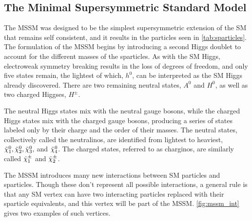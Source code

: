 \subsection{The Minimal Supersymmetric Standard Model}

The \ac{MSSM} was designed to be the simplest supersymmetric extension of the \ac{SM} that remains self consistent, and it results in the particles seen in \autoref{tab:sparticles}\cite{Martin:1997ns}. The formulation of the \ac{MSSM} begins by introducing a second Higgs doublet to account for the different masses of the sparticles. As with the \ac{SM} Higgs, electroweak symmetry breaking results in the loss of degrees of freedom, and only five states remain, the lightest of which, $h^0$, can be interpreted as the \ac{SM} Higgs already discovered. There are two remaining neutral states, $A^0$ and $H^0$, as well as two charged Higgses, $H^\pm$. 

The neutral Higgs states mix with the neutral gauge bosons, while the charged Higgs states mix with the charged gauge bosons, producing a series of states labeled only by their charge and the order of their masses. The neutral states, collectively called the neutralinos, are identified from lightest to heaviest, $\No[1], \No[2], \No[3],$ and $\No[4]$. The charged states, referred to as charginos, are similarly called $\Co[1]$ and $\Co[2]$.

The \ac{MSSM} introduces many new interactions between \ac{SM} particles and sparticles. Though these don't represent all possible interactions, a general rule is that any \ac{SM} vertex can have two interacting particles replaced with their sparticle equivalents, and this vertex will be part of the \ac{MSSM}. \autoref{fig:mssm_int} gives two examples of such vertices. 

